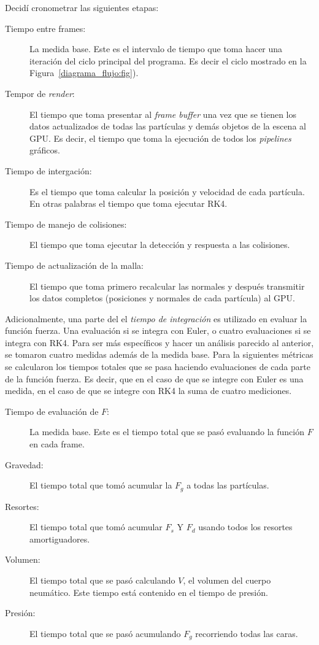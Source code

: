 Decidí cronometrar las siguientes etapas:
\begin{description}
 \item[Tiempo entre frames:] La medida base. Este es el intervalo  de tiempo que toma hacer una iteración del ciclo principal del programa. Es decir el ciclo mostrado en la Figura~\ref{diagrama_flujo:fig}).
 \item[Tempor de \emph{\textenglish{render}}:] El tiempo que toma presentar al \emph{\textenglish{frame buffer}} una vez que se tienen los datos actualizados de todas las partículas y demás objetos de la escena al GPU. Es decir, el tiempo que toma la ejecución de todos los \emph{\textenglish{pipelines}} gráficos.
 \item[Tiempo de intergación:] Es el tiempo que toma calcular la posición y velocidad de cada partícula. En otras palabras el tiempo que toma ejecutar RK4.
 \item[Tiempo de manejo de colisiones:] El tiempo que toma ejecutar la detección y respuesta a las colisiones.
 \item[Tiempo de actualización de la malla:] El tiempo que toma primero recalcular las normales y después transmitir los datos completos (posiciones y normales de cada partícula) al GPU.
\end{description}

Adicionalmente, una parte del el \emph{tiempo de integración} es utilizado en evaluar la función fuerza.
Una evaluación si se integra con Euler, o cuatro evaluaciones si se integra con RK4.
Para ser más específicos y hacer un análisis parecido al anterior, se tomaron cuatro medidas además de la medida base.
Para la siguientes métricas se calcularon los tiempos totales que se pasa haciendo evaluaciones de cada parte de la función fuerza.
Es decir, que en el caso de que se integre con Euler es una medida, en el caso de que se integre con RK4 la suma de cuatro mediciones.

\begin{description}
 \item[Tiempo de evaluación de $F$:] La medida base. Este es el tiempo total que se pasó evaluando la función $F$ en cada frame.
 \item[Gravedad:] El tiempo total que tomó acumular la $F_g$ a todas las partículas.
 \item[Resortes:] El tiempo total que tomó acumular $F_s$ Y $F_d$ usando todos los resortes amortiguadores.
 \item[Volumen:] El tiempo total que se pasó calculando $V$, el volumen del cuerpo neumático. Este tiempo está contenido en el tiempo de presión.
 \item[Presión:] El tiempo total que se pasó acumulando $F_g$ recorriendo todas las caras.
\end{description}

